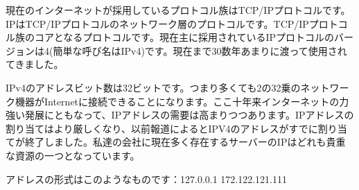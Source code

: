 現在のインターネットが採用しているプロトコル族はTCP/IPプロトコルです。IPはTCP/IPプロトコルのネットワーク層のプロトコルです。TCP/IPプロトコル族のコアとなるプロトコルです。現在主に採用されているIPプロトコルのバージョンは4(簡単な呼び名はIPv4)です。現在まで30数年あまりに渡って使用されてきました。

IPv4のアドレスビット数は32ビットです。つまり多くても2の32乗のネットワーク機器がInternetに接続できることになります。ここ十年来インターネットの力強い発展にともなって、IPアドレスの需要は高まりつつあります。IPアドレスの割り当てはより厳しくなり、以前報道によるとIPV4のアドレスがすでに割り当てが終了しました。私達の会社に現在多く存在するサーバーのIPはどれも貴重な資源の一つとなっています。

アドレスの形式はこのようなものです：127.0.0.1 172.122.121.111
